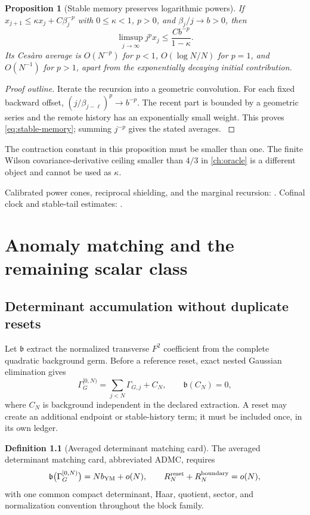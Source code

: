 \documentclass[11pt,oneside,openany]{book}
\newtheorem{proposition}[proposition]{Proposition}
\theoremstyle{definition}
\newtheorem{definition}[definition]{Definition}
\theoremstyle{remark}
\newcommand{\src}[2]{\cite[#2]{#1}}
\newcommand{\sourcebasis}[1]{\par\smallskip\noindent #1\par}
\begin{document}
\begin{proposition}[Stable memory preserves logarithmic powers]\label{prop:stable-memory}
If $x_{j+1}\le\kappa x_j+C\beta_j^{-p}$ with $0\le\kappa<1$, $p>0$, and $\beta_j/j\to b>0$, then
\begin{equation}\label{eq:stable-memory}
\limsup_{j\to\infty}j^p x_j\le\frac{Cb^{-p}}{1-\kappa}.
\end{equation}
Its Ces\`aro average is $O(N^{-p})$ for $p<1$, $O(\log N/N)$ for $p=1$, and $O(N^{-1})$ for $p>1$, apart from the exponentially decaying initial contribution.
\end{proposition}
\begin{proof}[Proof outline]
Iterate the recursion into a geometric convolution. For each fixed backward offset, $(j/\beta_{j-\ell})^p\to b^{-p}$. The recent part is bounded by a geometric series and the remote history has an exponentially small weight. This proves \cref{eq:stable-memory}; summing $j^{-p}$ gives the stated averages. \src{F11}{V1}
\end{proof}

The contraction constant in this proposition must be smaller than one. The finite Wilson covariance-derivative ceiling smaller than $4/3$ in \cref{ch:oracle} is a different object and cannot be used as $\kappa$.
\sourcebasis{Calibrated power cones, reciprocal shielding, and the marginal recursion: \src{F9}{V12--V14}. Cofinal clock and stable-tail estimates: \src{F11}{V1}.}

\chapter{Anomaly matching and the remaining scalar class}
\label{ch:anomaly}
\section{Determinant accumulation without duplicate resets}
Let $\mathfrak b$ extract the normalized transverse $F^2$ coefficient from the complete quadratic background germ. Before a reference reset, exact nested Gaussian elimination gives
\begin{equation}\label{eq:det-telescope}
\Gamma_G^{[0,N)}=\sum_{j<N}\Gamma_{G,j}+C_N,
\qquad \mathfrak b(C_N)=0,
\end{equation}
where $C_N$ is background independent in the declared extraction. A reset may create an additional endpoint or stable-history term; it must be included once, in its own ledger.

\begin{definition}[Averaged determinant matching card]\label{def:ADMC}
The averaged determinant matching card, abbreviated ADMC, requires
\begin{equation}\label{eq:ADMC}
\mathfrak b\bigl(\Gamma_G^{[0,N)}\bigr)=Nb_{\rm YM}+o(N),
\qquad R_N^{\rm reset}+R_N^{\rm boundary}=o(N),
\end{equation}
with one common compact determinant, Haar, quotient, sector, and normalization convention throughout the block family.
\end{definition}
\end{document}
